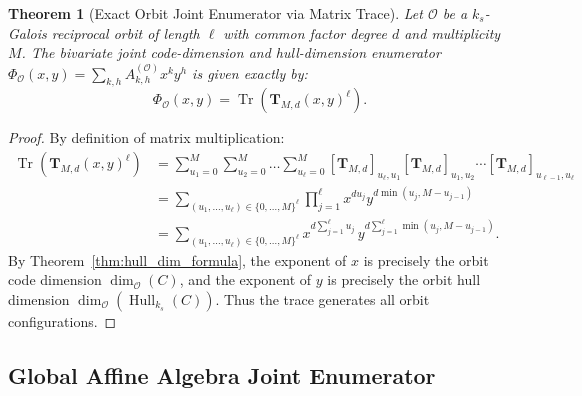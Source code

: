 \documentclass[preprint,12pt]{elsarticle}
\newcommand{\Tr}{\operatorname{Tr}}
\numberwithin{equation}{section}
\theoremstyle{plain}
\newtheorem{theorem}{Theorem}[section]
\theoremstyle{definition}
\theoremstyle{remark}
\begin{document}
\begin{theorem}[Exact Orbit Joint Enumerator via Matrix Trace]\label{thm:transfer_matrix_trace}
Let $\mathcal{O}$ be a $k_s$-Galois reciprocal orbit of length $\ell$ with common factor degree $d$ and multiplicity $M$. The bivariate joint code-dimension and hull-dimension enumerator $\Phi_{\mathcal{O}}(x, y) = \sum_{k, h} A_{k, h}^{(\mathcal{O})} x^k y^h$ is given exactly by:
\begin{equation}\label{eq:orbit_trace_formula}
    \Phi_{\mathcal{O}}(x, y) = \Tr\left( \mathbf{T}_{M, d}(x, y)^\ell \right).
\end{equation}
\end{theorem}
\begin{proof}
By definition of matrix multiplication:
\begin{align*}
    \Tr\left( \mathbf{T}_{M, d}(x, y)^\ell \right) &= \sum_{u_1=0}^M \sum_{u_2=0}^M \dots \sum_{u_\ell=0}^M \left[ \mathbf{T}_{M, d} \right]_{u_\ell, u_1} \left[ \mathbf{T}_{M, d} \right]_{u_1, u_2} \cdots \left[ \mathbf{T}_{M, d} \right]_{u_{\ell-1}, u_\ell} \\
    &= \sum_{(u_1, \dots, u_\ell) \in \{0, \dots, M\}^\ell} \prod_{j=1}^\ell x^{d u_j} y^{d \min(u_j, M - u_{j-1})} \\
    &= \sum_{(u_1, \dots, u_\ell) \in \{0, \dots, M\}^\ell} x^{d \sum_{j=1}^\ell u_j} \, y^{d \sum_{j=1}^\ell \min(u_j, M - u_{j-1})}.
\end{align*}
By Theorem~\ref{thm:hull_dim_formula}, the exponent of $x$ is precisely the orbit code dimension $\dim_{\mathcal{O}}(C)$, and the exponent of $y$ is precisely the orbit hull dimension $\dim_{\mathcal{O}}(\operatorname{Hull}_{k_s}(C))$. Thus the trace generates all orbit configurations.
\end{proof}

\subsection{Global Affine Algebra Joint Enumerator}
\end{document}
